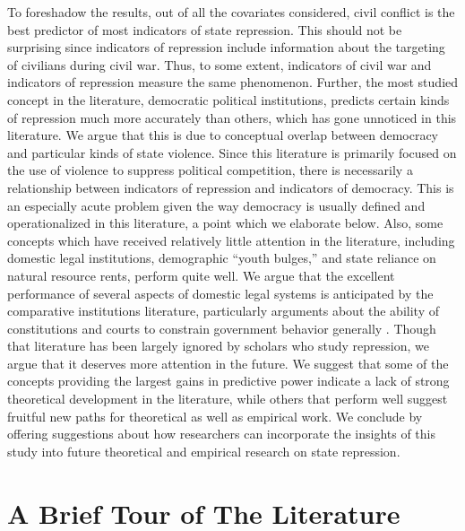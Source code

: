 \documentclass[12pt]{article}
\begin{document}
To foreshadow the results, out of all the covariates considered, civil conflict is the best predictor of most indicators of state repression. This should not be surprising since indicators of repression include information about the targeting of civilians during civil war. Thus, to some extent, indicators of civil war and indicators of repression measure the same phenomenon. Further, the most studied concept in the literature, democratic political institutions, predicts certain kinds of repression much more accurately than others, which has gone unnoticed in this literature. We argue that this is due to conceptual overlap between democracy and particular kinds of state violence. Since this literature is primarily focused on the use of violence to suppress political competition, there is necessarily a relationship between indicators of repression and indicators of democracy. This is an especially acute problem given the way democracy is usually defined and operationalized in this literature, a point which we elaborate below. Also, some concepts which have received relatively little attention in the literature, including domestic legal institutions, demographic ``youth bulges,'' and state reliance on natural resource rents, perform quite well. We argue that the excellent performance of several aspects of domestic legal systems is anticipated by the comparative institutions literature, particularly arguments about the ability of constitutions and courts to constrain government behavior generally \citep[E.g.,][]{NorthWeingast1989, Ordeshook1992, Weingast1997, Carey2000, Vanberg2005, ElkinsGinsburgMelton2009}. Though that literature has been largely ignored by scholars who study repression, we argue that it deserves more attention in the future. We suggest that some of the concepts providing the largest gains in predictive power indicate a lack of strong theoretical development in the literature, while others that perform well suggest fruitful new paths for theoretical as well as empirical work. We conclude by offering suggestions about how researchers can incorporate the insights of this study into future theoretical and empirical research on state repression. 

\section{A Brief Tour of The Literature}
\end{document}
